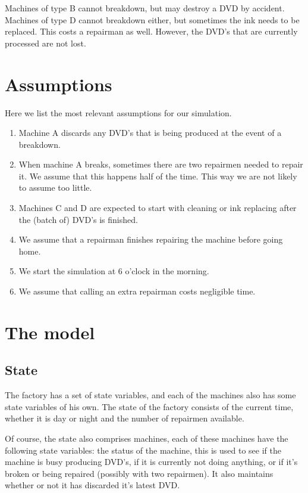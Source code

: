 \documentclass{article}
\begin{document}
Machines of type B cannot breakdown, but may destroy a DVD by accident.
Machines of type D cannot breakdown either, but sometimes the ink needs to be replaced.
This costs a repairman as well.
However, the DVD's that are currently processed are not lost.


\section{Assumptions}
Here we list the most relevant assumptions for our simulation.
\begin{enumerate}
    \item
        Machine A discards any DVD's that is being produced at the event of a breakdown.
    \item
        When machine A breaks, sometimes there are two repairmen needed to repair it.
        We assume that this happens half of the time.
        This way we are not likely to assume too little.
    \item
        Machines C and D are expected to start with cleaning or ink replacing after the (batch of) DVD's is finished.
    \item
        We assume that a repairman finishes repairing the machine before going home.
    \item
        We start the simulation at 6 o'clock in the morning.
    \item
        We assume that calling an extra repairman costs negligible time.
\end{enumerate}


\section{The model}
\subsection{State}
The factory has a set of state variables, and each of the machines also has some state variables of his own.
The state of the factory consists of the current time, whether it is day or night and the number of repairmen available.

Of course, the state also comprises machines, each of these machines have the following state variables:
the status of the machine, this is used to see if the machine is busy producing DVD's, if it is currently not doing anything, or if it's broken or being repaired (possibly with two repairmen).
It also maintains whether or not it has discarded it's latest DVD\@.
\end{document}
